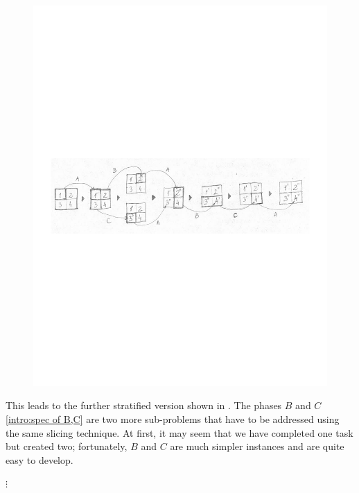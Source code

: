 \begin{figure}
\begin{center}
\includegraphics[width=.9\textwidth]{img/gap-stratify-A}
\end{center}
\caption{\label{evaluation:arbiter stratify A chain}}
\end{figure}

This leads to the further stratified version shown in .
The phases
$B$ and $C$ \eqref{intro:spec of B,C} are two more sub-problems that have to be addressed using the same slicing technique.
At first, it may seem that we have completed one task but created two; 
fortunately, $B$ and $C$ are much simpler instances
and are quite easy to develop.



\begin{center}$\vdots$
\end{center}


